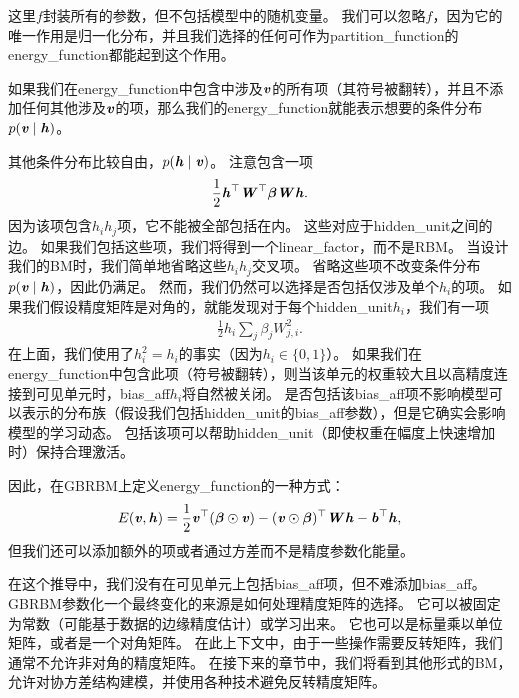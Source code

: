 
这里$f$封装所有的参数，但不包括模型中的随机变量。
我们可以忽略$f$，因为它的唯一作用是归一化分布，并且我们选择的任何可作为\gls{partition_function}的\gls{energy_function}都能起到这个作用。

如果我们在\gls{energy_function}中包含中涉及$\boldsymbol{\mathit{v}}$的所有项（其符号被翻转），并且不添加任何其他涉及$\boldsymbol{\mathit{v}}$的项，那么我们的\gls{energy_function}就能表示想要的条件分布$p(\boldsymbol{\mathit{v}}  \mid  \boldsymbol{\mathit{h}})$。

其他条件分布比较自由，$p(\boldsymbol{\mathit{h}}  \mid  \boldsymbol{\mathit{v}})$。
注意包含一项
\begin{align}
 \frac{1}{2}\boldsymbol{\mathit{h}}^\top\boldsymbol{\mathit{W}}^\top \boldsymbol{\beta} \boldsymbol{\mathit{W}} \boldsymbol{\mathit{h}} .
\end{align}
因为该项包含$h_i h_j$项，它不能被全部包括在内。
这些对应于\gls{hidden_unit}之间的边。
如果我们包括这些项，我们将得到一个\gls{linear_factor}，而不是\gls{RBM}。
当设计我们的\gls{BM}时，我们简单地省略这些$h_i h_j$交叉项。
省略这些项不改变条件分布$p(\boldsymbol{\mathit{v}}  \mid  \boldsymbol{\mathit{h}})$，因此仍满足。
然而，我们仍然可以选择是否包括仅涉及单个$h_i$的项。
如果我们假设精度矩阵是对角的，就能发现对于每个\gls{hidden_unit}$h_i$，我们有一项
\begin{align}
 \frac{1}{2} h_i \sum_j \beta_j W_{j,i}^2.
\end{align}
在上面，我们使用了$h_i^2 = h_i$的事实（因为$h_i \in \{ 0, 1\}$）。
如果我们在\gls{energy_function}中包含此项（符号被翻转），则当该单元的权重较大且以高精度连接到可见单元时，\gls{bias_aff}$h_i$将自然被关闭。
是否包括该\gls{bias_aff}项不影响模型可以表示的分布族（假设我们包括\gls{hidden_unit}的\gls{bias_aff}参数），但是它确实会影响模型的学习动态。
包括该项可以帮助\gls{hidden_unit}（即使权重在幅度上快速增加时）保持合理激活。

因此，在\gls{GBRBM}上定义\gls{energy_function}的一种方式：
\begin{align}
 E(\boldsymbol{\mathit{v}}, \boldsymbol{\mathit{h}}) = \frac{1}{2} \boldsymbol{\mathit{v}}^\top (\boldsymbol{\beta} \odot \boldsymbol{\mathit{v}}) -  (\boldsymbol{\mathit{v}} \odot \boldsymbol{\beta})^\top\boldsymbol{\mathit{W}} \boldsymbol{\mathit{h}} - \boldsymbol{\mathit{b}}^\top \boldsymbol{\mathit{h}},
\end{align}
但我们还可以添加额外的项或者通过方差而不是精度参数化能量。


在这个推导中，我们没有在可见单元上包括\gls{bias_aff}项，但不难添加\gls{bias_aff}。
\gls{GBRBM}参数化一个最终变化的来源是如何处理精度矩阵的选择。
它可以被固定为常数（可能基于数据的边缘精度估计）或学习出来。
它也可以是标量乘以单位矩阵，或者是一个对角矩阵。
在此上下文中，由于一些操作需要反转矩阵，我们通常不允许非对角的精度矩阵。
在接下来的章节中，我们将看到其他形式的\gls{BM}，允许对协方差结构建模，并使用各种技术避免反转精度矩阵。



